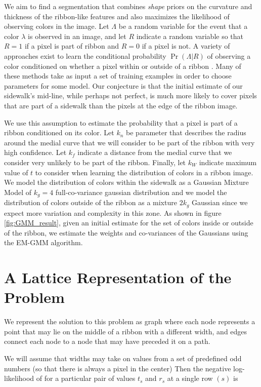 We aim to find a segmentation that combines \textit{shape} priors on the curvature and thickness of the ribbon-like features and also maximizes the likelihood of observing colors in the image. 
Let $\Lambda$ be a random variable for the event that a color $\lambda$ is observed in an image, and let $R$ indicate a random variable so that $R=1$ if a pixel is part of ribbon and $R=0$ if a pixel is not. 
A variety of approaches exist to learn the conditional probability $\Pr(\Lambda|R)$ of observing a color conditioned on whether a pixel within or outside of a ribbon \cite{hartigan1979algorithm, jordan1999introduction}.
Many of these methods take as input a set of training examples in order to choose parameters for some model.
Our conjecture is that the initial estimate of our sidewalk's mid-line, while perhaps not perfect, is much more likely to cover pixels that are part of a sidewalk than the pixels at the edge of the ribbon image. 

We use this assumption to estimate the probability that a pixel is part of a ribbon conditioned on its color.
Let $k_n$ be parameter that describes the radius around the medial curve that we will consider to be part of the ribbon with very high confidence. 
Let $k_f$ indicate a distance from the medial curve that we consider very unlikely to be part of the ribbon. 
Finally, let $k_W$ indicate maximum value of $t$ to consider when learning the distribution of colors in a ribbon image. 
We model the distribution of colors within the sidewalk as a Gaussian Mixture Model of $k_g=4$ full-co-variance gaussian distribution and we model the distribution of colors outside of the ribbon as a mixture $2k_g$ Gaussian since we expect more variation and complexity in this zone. 
As shown in figure \ref{fig:GMM_result}, given an initial estimate for the set of colors inside or outside of the ribbon, we estimate the weights and co-variances of the Gaussians using the \ac{EM-GMM} \cite{sridharan2014gaussian} algorithm. 


\section{A Lattice Representation of the Problem} 
We represent the solution to this problem as graph where each node represents a point that may lie on the middle of a ribbon with a different width, and edges connect each node to a node that may have preceded it on a path. 

We will assume that widths may take on values from a set of predefined odd numbers (so that there is always a pixel in the center) 
Then the negative log-likelihood of for a particular pair of values $t_s$ and $r_s$ at a single row $(s)$ is 

